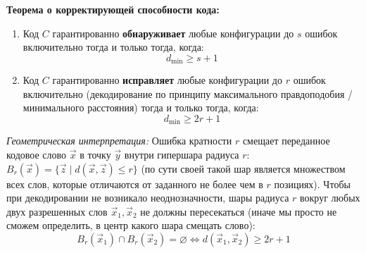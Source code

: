 \documentclass[11pt,a4paper]{article}
\begin{document}
\begin{theorembox}
\textbf{Теорема о корректирующей способности кода:}
\begin{enumerate}
    \item Код $C$ гарантированно \textbf{обнаруживает} любые конфигурации до $s$ ошибок включительно тогда и только тогда, когда:
    $$d_{\min} \ge s + 1$$
    \item Код $C$ гарантированно \textbf{исправляет} любые конфигурации до $r$ ошибок включительно (декодирование по принципу максимального правдоподобия / минимального расстояния) тогда и только тогда, когда:
    $$d_{\min} \ge 2r + 1$$
\end{enumerate}
\end{theorembox}

\textit{Геометрическая интерпретация:} Ошибка кратности $r$ смещает переданное кодовое слово $\vec{x}$ в точку $\vec{y}$ внутри гипершара радиуса $r$: $B_r(\vec{x}) = \{\vec{z} \mid d(\vec{x}, \vec{z}) \le r\}$ (по сути своей такой шар является множеством всех слов, которые отличаются от заданного не более чем в $r$ позициях). Чтобы при декодировании не возникало неоднозначности, шары радиуса $r$ вокруг любых двух разрешенных слов $\vec{x}_1, \vec{x}_2$ не должны пересекаться (иначе мы просто не сможем определить, в центр какого шара смещать слово):
$$B_r(\vec{x}_1) \cap B_r(\vec{x}_2) = \varnothing \iff d(\vec{x}_1, \vec{x}_2) \ge 2r + 1$$

\begin{center}
\end{center}
\end{document}
